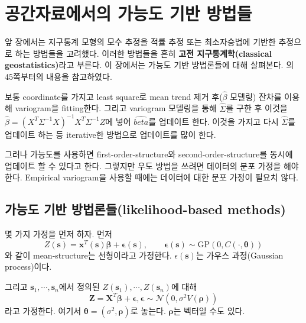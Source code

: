 \documentclass[b5paper,]{scrbook}
\theoremstyle{plain}
\theoremstyle{definition}
\numberwithin{equation}{section}
\begin{document}
\hypertarget{spatlikelihood}{%
\chapter{공간자료에서의 가능도 기반 방법들}\label{spatlikelihood}}

앞 장에서는 지구통계 모형의 모수 추정을 적률 추정 또는 최소자승법에 기반한 추정으로 하는 방법들을 고려했다. 이러한 방법들을 흔히 \textbf{고전 지구통계학(classical geostatistics)}라고 부른다. 이 장에서는 가능도 기반 방법론들에 대해 살펴본다. \citep{Gelfand2010}의 45쪽부터의 내용을 참고하였다.

보통 coordinate를 가지고 least square로 mean trend 제거 후(\(\hat{\beta}\) 모델링) 잔차를 이용해 variogram을 fitting한다. 그리고 variogram 모델링을 통해 \(\hat{\Sigma}\)를 구한 후 이것을 \(\hat{\beta}=(X^{T}\Sigma^{-1}X)^{-1}X^{T}\Sigma^{-1}Z\)에 넣어 \(\hat{beta}\)를 업데이트 한다. 이것을 가지고 다시 \(\hat{\Sigma}\)를 업데이트 하는 등 iterative한 방법으로 업데이트를 많이 한다.

그러나 가능도를 사용하면 first-order-structure와 second-order-structure를 동시에 업데이트 할 수 있다고 한다. 그렇지만 우도 방법을 쓰려면 데이터의 분포 가정을 해야 한다. Empirical variogram을 사용할 때에는 데이터에 대한 분포 가정이 필요치 않다.

\hypertarget{--likelihood-based-methods}{%
\section{가능도 기반 방법론들(likelihood-based methods)}\label{--likelihood-based-methods}}

몇 가지 가정을 먼저 하자. 먼저
\[Z(\mathbf{s})=\mathbf{x}^{T}(\mathbf{s})\boldsymbol{\beta}+\boldsymbol{\epsilon}(\mathbf{s}), \qquad{\boldsymbol{\epsilon}(\mathbf{s}) \sim  \text{GP}(0, C(\cdot, \boldsymbol{\theta}))}\]
와 같이 mean-structure는 선형이라고 가정한다. \(\epsilon(\mathbf{s})\)는 가우스 과정(Gaussian process)이다.

그리고 \(\mathbf{s}_{1}, \cdots , \mathbf{s}_{n}\)에서 정의된 \(Z(\mathbf{s}_{1}), \cdots , Z(\mathbf{s}_{n})\)에 대해
\[\mathbf{Z}=\mathbf{X}^{T}\boldsymbol{\beta}+\boldsymbol{\epsilon}, \boldsymbol{\epsilon} \sim \mathcal{N}(0, \sigma^{2}V(\boldsymbol{\rho}))\]
라고 가정한다. 여기서 \(\boldsymbol{\theta}=(\sigma^{2}, \boldsymbol{\rho})\)로 놓는다. \(\boldsymbol{\rho}\)는 벡터일 수도 있다.
\end{document}
